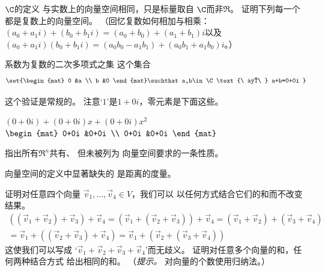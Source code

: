   \item 
    $\C$的定义
    与实数上的向量空间相同，只是标量取自
    \( \C \)而非\( \Re \)。
    证明下列每一个都是复数上的向量空间。
    （回忆复数如何相加与相乘：
    \( (a_0+a_1i)+(b_0+b_1i)=(a_0+b_0)+(a_1+b_1)i \)以及
    \( (a_0+a_1i)(b_0+b_1i)=(a_0b_0-a_1b_1)+(a_0b_1+a_1b_0)i \)。）
    \begin{exparts}
      \partsitem 系数为复数的二次多项式之集
      \partsitem 这个集合
        \begin{equation*}
          \set{\begin{mat}
                 0  &a  \\
                 b  &0
               \end{mat}\suchthat a,b\in\C\text{\ 且\ }
                               a+b=0+0i }
        \end{equation*}
    \end{exparts}
    \begin{answer}
      这个验证是常规的。
      注意`\( 1 \)'是\( 1+0i \)，零元素是下面这些。
      \begin{exparts}
        \partsitem \( (0+0i)+(0+0i)x+(0+0i)x^2 \)
        \partsitem \( \begin{mat}
                   0+0i  &0+0i  \\
                   0+0i  &0+0i
                 \end{mat} \)
      \end{exparts}  
    \end{answer}
  \item 
    指出所有\( \Re^n \)共有、
    但未被列为
    向量空间要求的一条性质。
    \begin{answer}
      向量空间的定义中显著缺失的
      是距离的度量。  
    \end{answer}
  \item 
    \begin{exparts}
      \partsitem 证明对任意四个向量
        \( \vec{v}_1,\ldots,\vec{v}_4\in V \)，我们可以
        以任何方式结合它们的和而不改变结果。
        \begin{multline*}
          ((\vec{v}_1+\vec{v}_2)+\vec{v}_3)+\vec{v}_4
          =(\vec{v}_1+(\vec{v}_2+\vec{v}_3))+\vec{v}_4  
          =(\vec{v}_1+\vec{v}_2)+(\vec{v}_3+\vec{v}_4)  \\
          =\vec{v}_1+((\vec{v}_2+\vec{v}_3)+\vec{v}_4)  
          =\vec{v}_1+(\vec{v}_2+(\vec{v}_3+\vec{v}_4))
        \end{multline*}
        这使我们可以写成
        `\( \vec{v}_1+\vec{v}_2+\vec{v}_3+\vec{v}_4 \)'而无歧义。
      \partsitem 证明对任意多个向量的和，任何两种结合方式
        给出相同的和。
        （\textit{提示。}  对向量的个数使用归纳法。）
    \end{exparts}
